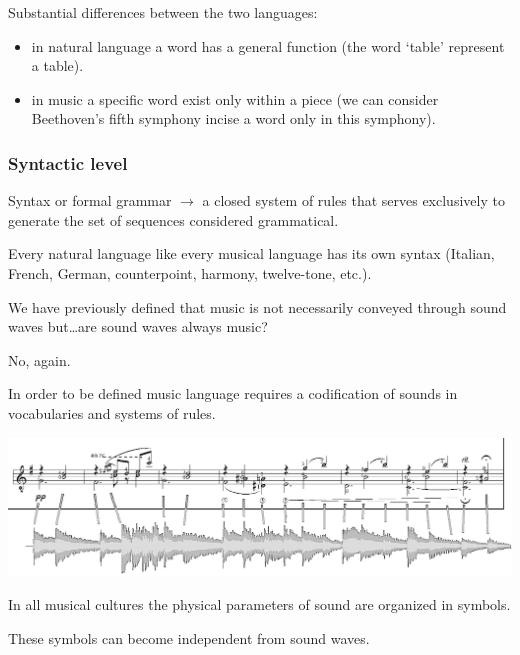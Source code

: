 Substantial differences between the two languages:

\begin{itemize}
\tightlist
\item in natural language a word has a general function (the word `table' represent a table).
\item in music a specific word exist only within a piece (we can consider Beethoven's fifth symphony incise a word only in this symphony).
\end{itemize}

\subsubsection{Syntactic level }\label{syntactic-level}

Syntax or formal grammar \(\rightarrow\) a closed system of rules that serves exclusively to generate the set of sequences considered grammatical.

Every natural language like every musical language has its own syntax (Italian, French, German, counterpoint, harmony, twelve-tone, etc.).

We have previously defined that music is not necessarily conveyed through sound waves but\ldots are sound waves always music?

No, again.

In order to be defined music language requires a codification of sounds in vocabularies and systems of rules.

\begin{center}
\includegraphics[scale=1.1]{../img/ondenote.png}
\end{center}

In all musical cultures the physical parameters of sound are organized in symbols.

These symbols can become independent from sound waves.

